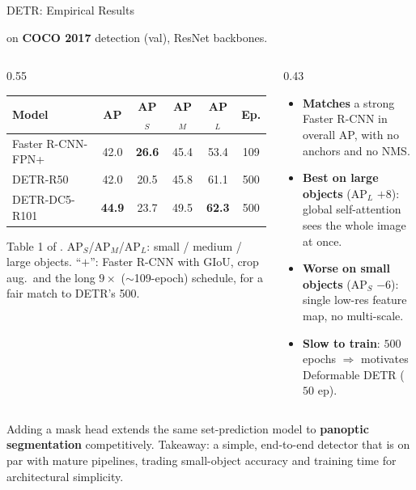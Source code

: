 \begin{frame}{DETR: Empirical Results}

  \cite{carion2020detr} on \textbf{COCO 2017} detection (val), ResNet backbones.

  \vspace{0.3em}
  \begin{columns}[T]
    \begin{column}{0.55\textwidth}
      \begin{center}
        \small
        \begin{tabular}{lccccc}
          \toprule
          \textbf{Model} & \textbf{AP} & \textbf{AP$_S$} & \textbf{AP$_M$} & \textbf{AP$_L$} & \textbf{Ep.} \\
          \midrule
          Faster R-CNN-FPN+ & 42.0 & \textbf{26.6} & 45.4 & 53.4 & 109 \\
          DETR-R50          & 42.0 & 20.5 & 45.8 & 61.1 & 500 \\
          DETR-DC5-R101     & \textbf{44.9} & 23.7 & 49.5 & \textbf{62.3} & 500 \\
          \bottomrule
        \end{tabular}
      \end{center}
      \vspace{0.2em}
      {\footnotesize Table 1 of \cite{carion2020detr}. AP$_S$/AP$_M$/AP$_L$: small / medium / large objects. ``$+$'': Faster R-CNN with GIoU, crop aug.\ and the long $9\times$ ($\sim$109-epoch) schedule, for a fair match to DETR's 500.}
    \end{column}
    \begin{column}{0.43\textwidth}
      \begin{itemize}
        \item \textbf{Matches} a strong Faster R-CNN in overall AP, with no anchors and no NMS.
        \item \textbf{Best on large objects} (AP$_L$ $+8$): global self-attention sees the whole image at once.
        \item \textbf{Worse on small objects} (AP$_S$ $-6$): single low-res feature map, no multi-scale.
        \item \textbf{Slow to train}: $500$ epochs $\Rightarrow$ motivates Deformable DETR ($50$ ep).
      \end{itemize}
    \end{column}
  \end{columns}

  \vspace{0.2em}
  {\footnotesize Adding a mask head extends the same set-prediction model to \textbf{panoptic segmentation} competitively. Takeaway: a simple, end-to-end detector that is on par with mature pipelines, trading small-object accuracy and training time for architectural simplicity.}
\end{frame}

